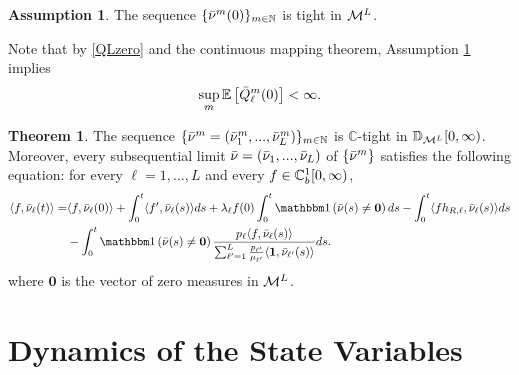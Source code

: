 \documentclass{article}
\theoremstyle{definition}
\newtheorem{assumption}{Assumption}[part]
\newtheorem{theorem}{Theorem}[section]
\numberwithin{equation}{section}
\begin{document}
\begin{assumption}\label{asm_initial}
The sequence $\{\bar{\nu}^m(0)\}_{m\in\mathbb{N}}$ is tight in $\mathcal{M}^L$.
\end{assumption}
Note that by \eqref{QLzero} and the continuous mapping theorem, Assumption \ref{asm_initial} implies 
\begin{equation}\label{Q0_bound}
\sup_m \mathbb{E}\left[\bar {Q}^m_\ell(0)\right]<\infty.
\end{equation}




\begin{theorem}\label{thm_conv}
The sequence $\{\bar{\nu}^m=(\bar{\nu}_1^m,...,\bar{\nu}_L^m)\}_{m\in\mathbb{N}}$ is $\mathbb{C}$-tight in $\mathbb{D}_{\mathcal{M}^L}[0,\infty)$. Moreover, every subsequential limit $\bar{\nu}=(\bar{\nu}_1,...,\bar{\nu}_L)$ of $\{\bar{\nu}^m\}$ satisfies the following equation: for every $\ell=1,...,L$ and every $f\in\mathbb{C}_b^{1}[0,\infty)$,
\begin{align}\label{fluid_eq}
  \langle f,\bnu_\ell(t)\rangle  = & \langle f,\bnu_\ell(0)\rangle + \int_0^t\langle f' ,\bnu_\ell(s)\rangle ds +\lambda_\ell f(0)\int_0^t\indic{\bar\nu(s)\neq\mathbf{0}}ds - \int_0^t\langle fh_{R,\ell},\bnu_\ell(s)\rangle ds \\
  &- \int_0^t\indic{\bar\nu(s)\neq \mathbf{0}}\frac{\weight_\ell\langle f,\bnu_\ell(s)\rangle}{\sum_{\ell'=1}^{L}\frac{\weight_{\ell'}}{\mu_{\ell'}}\langle\f1,\bnu_{\ell'}(s)\rangle} ds.\notag
\end{align}
where $\mathbf{0}$ is the vector of zero measures in $\mathcal{M}^L$.
\end{theorem}




\section{Dynamics of the State Variables}
\end{document}
